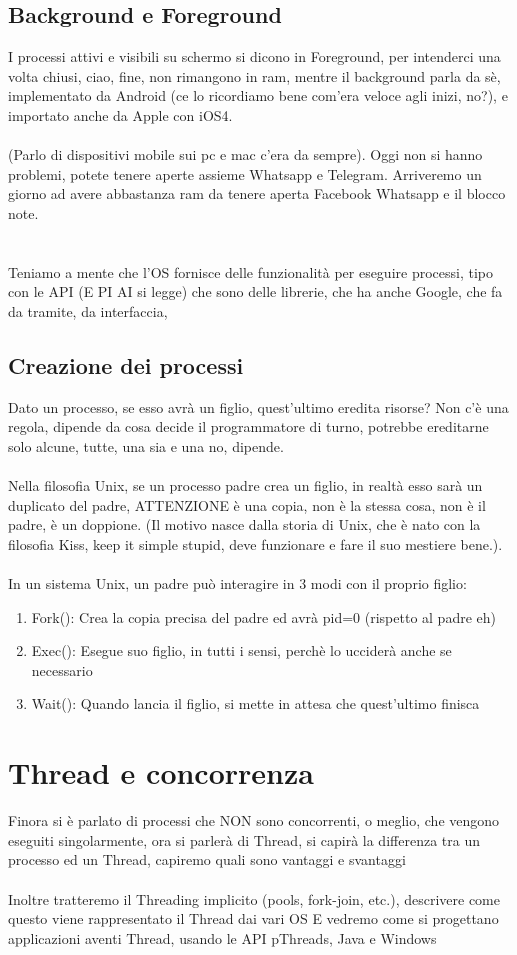 \documentclass[12pt, a4paper, openany, twoside]{book}
\begin{document}
\section{Background e Foreground}
I processi attivi e visibili su schermo si dicono in Foreground, per intenderci
una volta chiusi, ciao, fine, non rimangono in ram, mentre il background parla
da sè, implementato da Android (ce lo ricordiamo bene com'era veloce agli inizi,
no?), e importato anche da Apple con iOS4. \\ \\
(Parlo di dispositivi mobile sui pc e mac c'era da sempre).
Oggi non si hanno problemi, potete tenere aperte 
assieme Whatsapp e Telegram. Arriveremo un giorno ad avere abbastanza ram da 
tenere aperta Facebook Whatsapp e il blocco note.
\\ \\ \\
Teniamo a mente che l'OS fornisce delle funzionalità per eseguire processi, tipo
con le API (E PI AI si legge) che sono delle librerie, che ha anche Google, 
che fa da tramite, da interfaccia,
\section{Creazione dei processi}
Dato un processo, se esso avrà un figlio, quest'ultimo eredita risorse? Non c'è
una regola, dipende da cosa decide il programmatore di turno, potrebbe ereditarne
solo alcune, tutte, una sia e una no, dipende.
\\ \\
Nella filosofia Unix, se un processo padre crea un figlio, in realtà esso
sarà un duplicato del padre, ATTENZIONE è una copia, non è la stessa cosa, non è
il padre, è un doppione. (Il motivo nasce dalla storia di Unix, che è nato con
la filosofia Kiss, keep it simple stupid, deve funzionare e fare il suo mestiere
bene.).\\ \\
In un sistema Unix, un padre può interagire in 3 modi con il proprio figlio:
\begin{enumerate}
	\item Fork(): Crea la copia precisa del padre ed avrà pid=0 (rispetto al padre eh)
	\item Exec(): Esegue suo figlio, in tutti i sensi, perchè lo ucciderà anche se necessario
	\item Wait(): Quando lancia il figlio, si mette in attesa che quest'ultimo finisca
\end{enumerate} 
\chapter{Thread e concorrenza}
Finora si è parlato di processi che NON sono concorrenti, o meglio, che vengono
eseguiti singolarmente, ora si parlerà di Thread, si capirà la differenza tra
un processo ed un Thread, capiremo quali sono vantaggi e svantaggi\\ \\
Inoltre tratteremo il Threading implicito (pools, fork-join, etc.), descrivere
come questo viene rappresentato il Thread dai vari OS E vedremo come si 
progettano applicazioni aventi Thread, usando le API pThreads, Java e Windows
\end{document}
